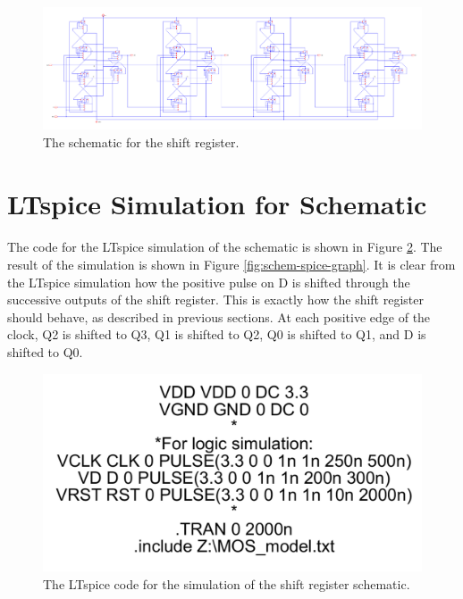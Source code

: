 \documentclass{article}
\begin{document}
  \begin{figure}[H]
    \centering
    \includegraphics[width=\linewidth, frame]{screenshots/schem.png}
    \caption{The schematic for the shift register.}
    \label{fig:schem}
  \end{figure}

\section{LTspice Simulation for Schematic}
  \paragraph{}
  The code for the LTspice simulation of the schematic is shown in Figure \ref{fig:spice-sim}. The result of the simulation is shown in Figure \ref{fig:schem-spice-graph}. It is clear from the LTspice simulation how the positive pulse on D is shifted through the successive outputs of the shift register. This is exactly how the shift register should behave, as described in previous sections. At each positive edge of the clock, Q2 is shifted to Q3, Q1 is shifted to Q2, Q0 is shifted to Q1, and D is shifted to Q0. 


  \begin{figure}[H]
    \centering
    \includegraphics[width=0.5\linewidth, frame]{screenshots/spice-sim.png}
    \caption{The LTspice code for the simulation of the shift register schematic.}
    \label{fig:spice-sim}
  \end{figure}
\end{document}
